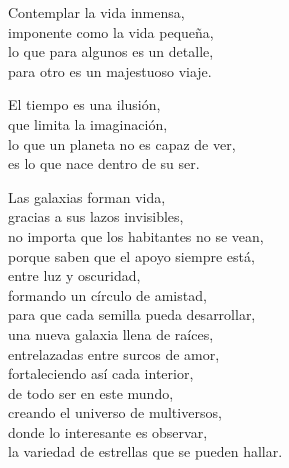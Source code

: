 \begin{center}
\vspace{1em} 
Contemplar la vida inmensa,\\ 
imponente como la vida pequeña,\\ 
lo que para algunos es un detalle,\\ 
para otro es un majestuoso viaje.

\vspace{1em} 
El tiempo es una ilusión,\\ 
que limita la imaginación,\\ 
lo que un planeta no es capaz de ver,\\ 
es lo que nace dentro de su ser.

\vspace{1em} 
Las galaxias forman vida,\\ 
gracias a sus lazos invisibles,\\ 
no importa que los habitantes no se vean,\\ 
porque saben que el apoyo siempre está,\\ 
entre luz y oscuridad,\\ 
formando un círculo de amistad,\\ 
para que cada semilla pueda desarrollar,\\ 
una nueva galaxia llena de raíces,\\ 
entrelazadas entre surcos de amor,\\ 
fortaleciendo así cada interior,\\ 
de todo ser en este mundo,\\ 
creando el universo de multiversos,\\ 
donde lo interesante es observar,\\ 
la variedad de estrellas que se pueden hallar.


\end{center}




